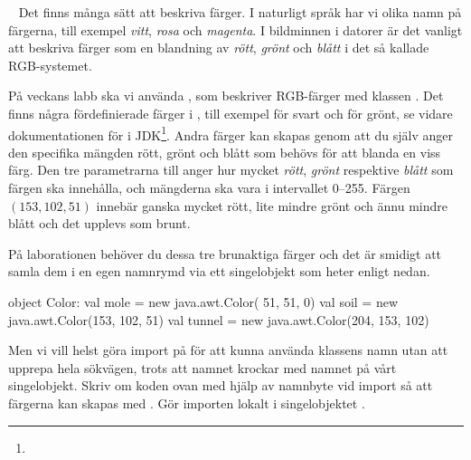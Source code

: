 \QUESTEND




\QUESTBEGIN

\Task \what~ Det finns många sätt att beskriva färger.
I naturligt språk har vi olika namn på färgerna, till exempel \emph{vitt}, \emph{rosa} och \emph{magenta}.
I bildminnen i datorer är det vanligt att beskriva färger som en blandning av \emph{rött}, \emph{grönt} och \emph{blått} i det så kallade RGB-systemet.

På veckans labb ska vi använda , som beskriver RGB-färger med klassen .
Det finns några fördefinierade färger i , till exempel  för svart och  för grönt, se vidare dokumentationen för  i JDK\footnote{\JDKApiUrl}.
Andra färger kan skapas genom att du själv anger den specifika mängden rött, grönt och blått som behövs för att blanda en viss färg.
Den tre parametrarna till  anger hur mycket \emph{rött}, \emph{grönt} respektive \emph{blått} som färgen ska innehålla, och mängderna ska vara i intervallet 0--255.
Färgen $(153, 102, 51)$ innebär ganska mycket rött, lite mindre grönt och ännu mindre blått och det upplevs som brunt.


\Subtask
På laborationen behöver du dessa tre brunaktiga färger och det är smidigt att samla dem i en egen namnrymd via ett singelobjekt som heter  enligt nedan.
\begin{Code}
object Color:
  val mole   = new java.awt.Color( 51,  51,   0)
  val soil   = new java.awt.Color(153, 102,  51)
  val tunnel = new java.awt.Color(204, 153, 102)
\end{Code}
\noindent Men vi vill helst göra import på  för att kunna använda klassens namn utan att upprepa hela sökvägen, trots att namnet krockar med namnet på vårt singelobjekt. Skriv om koden ovan med hjälp av namnbyte vid import så att färgerna kan skapas med . Gör importen lokalt i singelobjektet .



